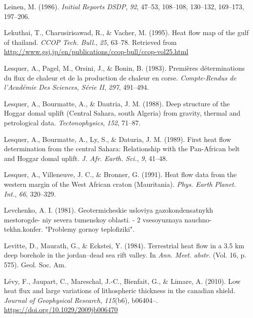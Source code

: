 \begin{CSLReferences}{1}{1}
\leavevmode{}%
Leinen, M. (1986). \emph{Initial Reports DSDP}, \emph{92}, 47--53, 108--108, 130--132, 169--173, 197--206.

\leavevmode{}%
Lekuthai, T., Charusirisawad, R., \& Vacher, M. (1995). Heat flow map of the gulf of thailand. \emph{CCOP Tech. Bull.}, \emph{25}, 63--78. Retrieved from \url{http://www.gsj.jp/en/publications/ccop-bull/ccop-vol25.html}

\leavevmode{}%
Lesquer, A., Pagel, M., Orsini, J., \& Bonin, B. (1983). Premières déterminations du flux de chaleur et de la production de chaleur en corse. \emph{Compte-Rendus de l'Académie Des Sciences, Série II}, \emph{297}, 491--494.

\leavevmode{}%
Lesquer, A., Bourmatte, A., \& Dautria, J. M. (1988). Deep structure of the {Hoggar} domal uplift {(Central Sahara, south Algeria)} from gravity, thermal and petrological data. \emph{Tectonophysics}, \emph{152}, 71--87.

\leavevmode{}%
Lesquer, A., Bourmatte, A., Ly, S., \& Daturia, J. M. (1989). First heat flow determination from the central {Sahara}: Relationship with the {Pan-African} belt and {Hoggar} domal uplift. \emph{J. Afr. Earth. Sci.}, \emph{9}, 41--48.

\leavevmode{}%
Lesquer, A., Villeneuve, J. C., \& Bronner, G. (1991). Heat flow data from the western margin of the {West African} craton {(Mauritania)}. \emph{Phys. Earth Planet. Int.}, \emph{66}, 320--329.

\leavevmode{}%
Levchenko, A. I. (1981). Geotermicheskie usloviya gazokondensatnykh mestorogde- niy severa tumenskoy oblasti. - 2 vsesoyuznaya nauchno-tekhn.konfer. "Problemy gornoy teplofiziki".

\leavevmode{}%
Levitte, D., Maurath, G., \& Eckstei, Y. (1984). Terrestrial heat flow in a 3.5 km deep borehole in the jordan--dead sea rift valley. In \emph{Ann. Meet. abstr.} (Vol. 16, p. 575). Geol. Soc. Am.

\leavevmode{}%
Lévy, F., Jaupart, C., Mareschal, J.-C., Bienfait, G., \& Limare, A. (2010). Low heat flux and large variations of lithospheric thickness in the canadian shield. \emph{Journal of Geophysical Research}, \emph{115}(b6), b06404--. \url{https://doi.org/10.1029/2009jb006470}


\end{CSLReferences}
